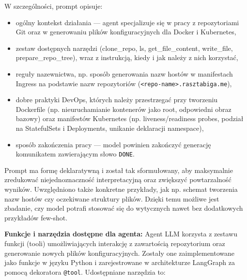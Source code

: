 W szczególności, prompt opisuje:
\begin{itemize}
    \item ogólny kontekst działania — agent specjalizuje się w pracy z repozytoriami Git oraz w generowaniu plików konfiguracyjnych dla Docker i Kubernetes,
    \item zestaw dostępnych narzędzi (clone\_repo, ls, get\_file\_content, write\_file, prepare\_repo\_tree), wraz z instrukcją, kiedy i jak należy z nich korzystać,
    \item reguły nazewnictwa, np. sposób generowania nazw hostów w manifestach Ingress na podstawie nazw repozytoriów (\texttt{<repo-name>.rasztabiga.me}),
    \item dobre praktyki DevOps, których należy przestrzegać przy tworzeniu Dockerfile (np. nieuruchamianie kontenerów jako root, odpowiedni obraz bazowy) oraz manifestów Kubernetes (np. liveness/readiness probes, podział na StatefulSets i Deployments, unikanie deklaracji namespace),
    \item sposób zakończenia pracy — model powinien zakończyć generację komunikatem zawierającym słowo \texttt{DONE}.
\end{itemize}

Prompt ma formę deklaratywną i został tak sformułowany, aby maksymalnie zredukować niejednoznaczność interpretacyjną oraz zwiększyć powtarzalność wyników. Uwzględniono także konkretne przykłady, jak np. schemat tworzenia nazw hostów czy oczekiwane struktury plików. Dzięki temu możliwe jest zbadanie, czy model potrafi stosować się do wytycznych nawet bez dodatkowych przykładów few-shot.

\bigskip
\noindent
\textbf{Funkcje i narzędzia dostępne dla agenta:}  
Agent LLM korzysta z zestawu funkcji (tooli) umożliwiających interakcję z zawartością repozytorium oraz generowanie nowych plików konfiguracyjnych. Zostały one zaimplementowane jako funkcje w języku Python i zarejestrowane w architekturze LangGraph za pomocą dekoratora \texttt{@tool}. Udostępniane narzędzia to:

